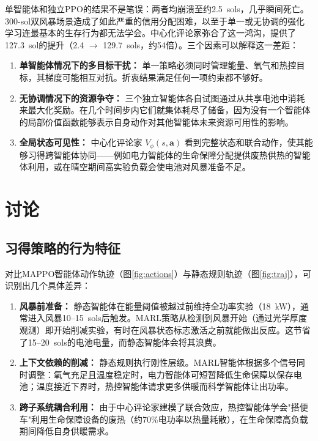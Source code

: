 \documentclass[11pt,a4paper]{ctexart}
\begin{document}
单智能体和独立PPO的结果不是笔误：两者均崩溃至约2.5~sols，几乎瞬间死亡。300-sol双风暴场景造成了如此严重的信用分配困难，以至于单一或无协调的强化学习连最基本的生存行为都无法学会。中心化评论家弥合了这一鸿沟，提供了127.3~sol的提升（2.4 $\rightarrow$ 129.7~sols，约54倍）。三个因素可以解释这一差距：

\begin{enumerate}[label=(\arabic*)]
  \item \textbf{单智能体情况下的多目标干扰：} 单一策略必须同时管理能量、氧气和热控目标，其梯度可能相互对抗。折衷结果满足任何一项约束都不够好。
  \item \textbf{无协调情况下的资源争夺：} 三个独立智能体各自试图通过从共享电池中消耗来最大化奖励。在几个时间步内它们就集体耗尽了储备，因为没有一个智能体的局部价值函数能够表示自身动作对其他智能体未来资源可用性的影响。
  \item \textbf{全局状态可见性：} 中心化评论家 $V_\phi(s, \mathbf{a})$ 看到完整状态和联合动作，使其能够习得跨智能体协同——例如电力智能体的生命保障分配提供废热供热的智能体利用，或在晴空期间高实验负载会使电池对风暴准备不足。
\end{enumerate}

\section{讨论}

\subsection{习得策略的行为特征}

对比MAPPO智能体动作轨迹（图\ref{fig:actions}）与静态规则轨迹（图\ref{fig:traj}），可识别出几个具体差异：

\begin{enumerate}[label=(\arabic*)]
  \item \textbf{风暴前准备：} 静态智能体在能量阈值被越过前维持全功率实验（18~kW），通常进入风暴10--15~sols后触发。MARL策略从检测到风暴开始（通过光学厚度观测）即开始削减实验，有时在风暴状态标志激活之前就能做出反应。这节省了15--20~sols的电池电量，而静态智能体会将其浪费。

  \item \textbf{上下文依赖的削减：} 静态规则执行刚性层级。MARL智能体根据多个信号同时调整：氧气充足且温度稳定时，电力智能体可短暂降低生命保障以保存电池；温度接近下界时，热控智能体请求更多供暖而科学智能体让出功率。

  \item \textbf{跨子系统耦合利用：} 由于中心评论家建模了联合效应，热控智能体学会"搭便车"利用生命保障设备的废热（约70\%电功率以热量耗散），在生命保障高负载期间降低自身供暖需求。
\end{enumerate}
\end{document}
